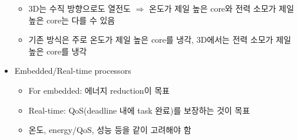 \begin{itemize}
\begin{itemize}
        \item 3D는 수직 방향으로도 열전도 $\Rightarrow$ 온도가 제일 높은 core와 전력 소모가 제일 높은 core는 다를 수 있음
        \item 기존 방식은 주로 온도가 제일 높은 core를 냉각, 3D에서는 전력 소모가 제일 높은 core를 냉각
    \end{itemize}
    \item Embedded/Real-time processors
    \begin{itemize}
        \item For embedded: 에너지 reduction이 목표
        \item Real-time: QoS(deadline 내에 task 완료)를 보장하는 것이 목표
        \item 온도, energy/QoS, 성능 등을 같이 고려해야 함
    \end{itemize}
\end{itemize}

